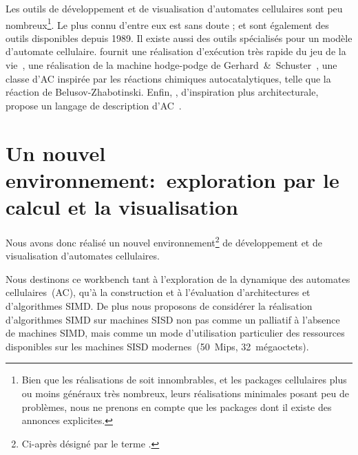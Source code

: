 Les outils de développement et de visualisation d'automates
cellulaires sont peu nombreux\footnote{%
  Bien que les réalisations de  soit
  innombrables, et les packages cellulaires plus ou moins généraux très
  nombreux, leurs réalisations minimales posant peu de problèmes, nous ne
  prenons en compte que les packages dont il existe des annonces
  explicites.}. %
Le plus connu d'entre eux est sans doute ;
 et  sont également des
outils disponibles depuis 1989. %
Il existe aussi des outils spécialisés pour un modèle d'automate
cellulaire. %
 fournit une réalisation d'exécution très rapide du
jeu de la vie~\cite[]{Berlekamp82},  une
réalisation de la machine hodge-podge de
Gerhard~\&~Schuster~\cite[]{Dewdney88}, une classe d'AC inspirée par
les réactions chimiques autocatalytiques, telle que la réaction de
Beluso\mbox{v-Z}habotinski. %
Enfin, , d'inspiration plus architecturale,
propose un langage de description d'AC~\cite[]{Eckart92a}. %
\nocite{Eckart92b}

\section[Le calcul et la visualisation]%
{Un nouvel environnement:~exploration par le calcul et la visualisation}

Nous avons donc réalisé un nouvel environnement\footnote{%
  Ci-après désigné par le terme .} %
de développement et de visualisation d'automates cellulaires. %

Nous destinons ce workbench tant à l'exploration de la dynamique
des automates cellulaires~(AC), qu'à la construction et à l'évaluation
d'architectures et d'algorithmes SIMD\@. %
De plus nous proposons de considérer la réalisation d'algorithmes SIMD
sur machines SISD non pas comme un palliatif à l'absence de machines
SIMD, mais comme un mode d'utilisation particulier des ressources
disponibles sur les machines SISD modernes~(50~Mips, 32~mégaoctets). %

